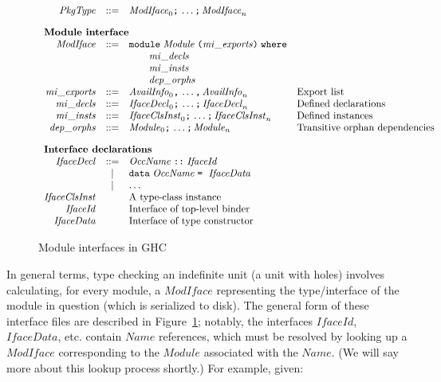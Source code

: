 \documentclass{article}
\newcommand{\I}[1]{\ensuremath{\mathit{#1}}}
\begin{document}
\begin{figure}[htpb]
$$
\begin{array}{rcll}
\I{PkgType} & ::= & \I{ModIface}_0 \verb|;|\, \ldots\verb|;|\, \I{ModIface}_n \\[1em]
\multicolumn{3}{l}{\mbox{\bf Module interface}} \\
\I{ModIface} & ::= & \verb|module| \; \I{Module} \; \verb|(| \I{mi\_exports} \verb|)| \; \verb|where| \\
& & \qquad \I{mi\_decls} \\
& & \qquad \I{mi\_insts} \\
& & \qquad \I{dep\_orphs} \\
\I{mi\_exports} & ::= & \I{AvailInfo}_0 \verb|,|\, \ldots \verb|,|\, \I{AvailInfo}_n & \mbox{Export list} \\
\I{mi\_decls} & ::= & \I{IfaceDecl}_0 \verb|;|\, \ldots \verb|;|\, \I{IfaceDecl}_n & \mbox{Defined declarations} \\
\I{mi\_insts} & ::= & \I{IfaceClsInst}_0 \verb|;|\, \ldots \verb|;|\, \I{IfaceClsInst}_n & \mbox{Defined instances} \\
\I{dep\_orphs} & ::= & \I{Module}_0 \verb|;|\, \ldots \verb|;|\, \I{Module}_n & \mbox{Transitive orphan dependencies} \\[1em]
\multicolumn{3}{l}{\mbox{\bf Interface declarations}} \\
\I{IfaceDecl} & ::= & \I{OccName} \; \verb|::| \; \I{IfaceId} \\
              & |   & \verb|data| \; \I{OccName} \; \verb|=| \;\ \I{IfaceData} \\
              & |   & \ldots \\
\I{IfaceClsInst} & & \mbox{A type-class instance} \\
\I{IfaceId} & & \mbox{Interface of top-level binder} \\
\I{IfaceData} & & \mbox{Interface of type constructor} \\
\end{array}
$$
\caption{Module interfaces in GHC} \label{fig:typecheck}
\end{figure}

In general terms,
type checking an indefinite unit (a unit with holes) involves
calculating, for every module, a \I{ModIface} representing the
type/interface of the module in question (which is serialized
to disk).  The general form of these
interface files are described in Figure~\ref{fig:typecheck}; notably,
the interfaces \I{IfaceId}, \I{IfaceData}, etc. contain \I{Name} references,
which must be resolved by
looking up a \I{ModIface} corresponding to the \I{Module} associated
with the \I{Name}. (We will say more about this lookup process shortly.)
For example, given:
\end{document}

